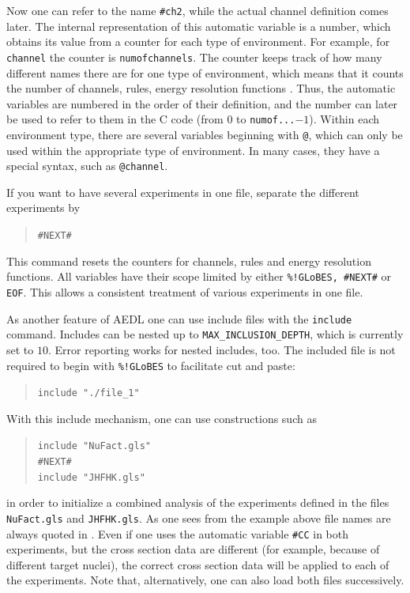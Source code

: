Now one can refer to the name {\tt \#ch2}, while the actual channel definition comes later. The internal representation of this automatic
variable is a number, which obtains its value from a counter for each type of environment. For example, for {\tt channel} the counter is {\tt numofchannels}. The counter keeps track of how many different names 
there are for one type of environment, which means that it counts the number of channels, rules, energy resolution functions \etc . Thus, the automatic
variables are numbered in the order of their definition, and the number
can later be used to refer to them in the C code (from $0$ to {\tt numof...}$-1$). Within each environment type, there are several 
variables beginning with {\tt @}, which can only be used within the 
appropriate type of environment. In many cases, 
they have a special syntax, such as {\tt @channel}.          

If you want to have several experiments in one file, separate the different
 experiments by 
\begin{quote}
{\tt    \#NEXT\#}
\end{quote}
This command resets the counters for channels, rules and energy resolution
functions. All variables have their scope limited 
by either {\tt \%!GLoBES, \#NEXT\#} or {\tt EOF}.  This allows 
a consistent treatment of various experiments in one file.

As another feature of AEDL one can use include files with the {\tt include} command. Includes can be nested up to {\tt MAX\_INCLUSION\_DEPTH}, which is currently set to $10$. Error reporting works 
 for nested includes, too. The included file is not required to begin 
 with {\tt \%!GLoBES} to facilitate cut and paste:
\begin{quote}
{\tt include "./file\_1"}
\end{quote}
With this include mechanism, one can use constructions such as 
\begin{quote}
{\tt    include  "NuFact.gls"\\
        \#NEXT\#\\
        include   "JHFHK.gls"
}
\end{quote}
in order to initialize a combined analysis of the experiments defined in the files {\tt NuFact.gls} and {\tt JHFHK.gls}. As one sees from the example above
file names are always quoted in \AEDL.
Even if one uses the
automatic variable {\tt \#CC} in both experiments, 
but the cross section data are different (for example, because of different target nuclei), the correct 
cross section data will be applied to each of the experiments. 
Note that, alternatively, one can 
also load both files successively. 

